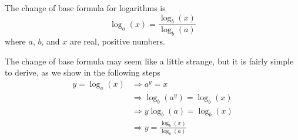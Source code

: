 \begin{pccspecialcomment}
	The change of base formula for logarithms is
	\begin{equation}\label{log:eq:changebase}
		\log_a(x)=\frac{\log_b(x)}{\log_b(a)}
	\end{equation}
	where $a$, $b$, and $x$ are real, positive numbers.
\end{pccspecialcomment}

The change of base formula may seem like a little strange, 
but it is fairly simple to derive, as we
show in the following steps
\begin{align*}
	y=\log_a(x) & \Rightarrow a^y=x                           \\
	            & \Rightarrow \log_b(a^y)=\log_b(x)           \\
	            & \Rightarrow y\log_b(a) = \log_b(x)          \\
	            & \Rightarrow y = \frac{\log_b(x)}{\log_b(a)} 
\end{align*}

